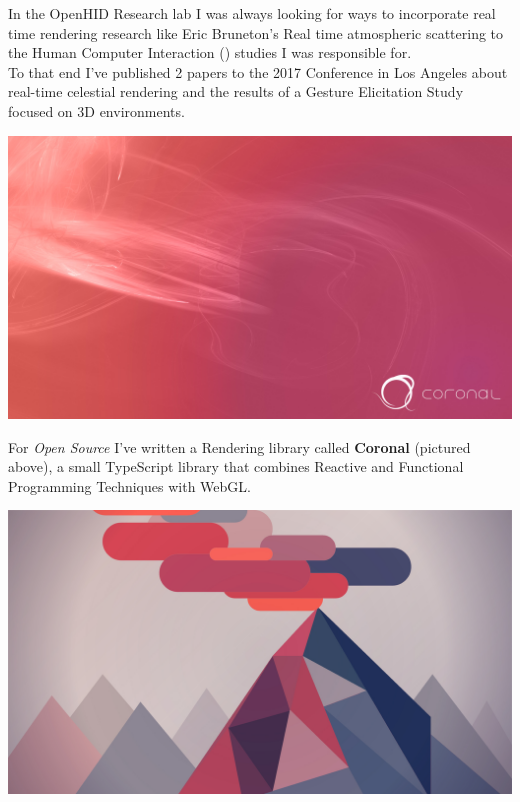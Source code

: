 \documentclass[10pt,a4paper]{article}
\begin{document}
\begin{multicols}{2}
In the OpenHID Research lab I was always looking for ways to incorporate real time rendering research like Eric Bruneton's Real time atmospheric scattering to the Human Computer Interaction () studies I was responsible for.\\

To that end I've published 2 papers to the  2017 Conference in Los Angeles about real-time celestial rendering and the results of a Gesture Elicitation Study focused on 3D environments.


\vspace{1.3em}

\noindent \includegraphics[width=\linewidth]{../portfolio/libraries/coronal/assets/cover.jpg}


\vspace{1.3em}

For \textit{Open Source} I've written a  Rendering library called \textbf{Coronal} (pictured above), a small TypeScript library that combines Reactive and Functional Programming Techniques with WebGL. 



\vspace{1.3em}

\noindent \includegraphics[width=\linewidth]{../portfolio/blog/raw-vulkan/assets/cover.jpg}



\end{multicols}
\end{document}
